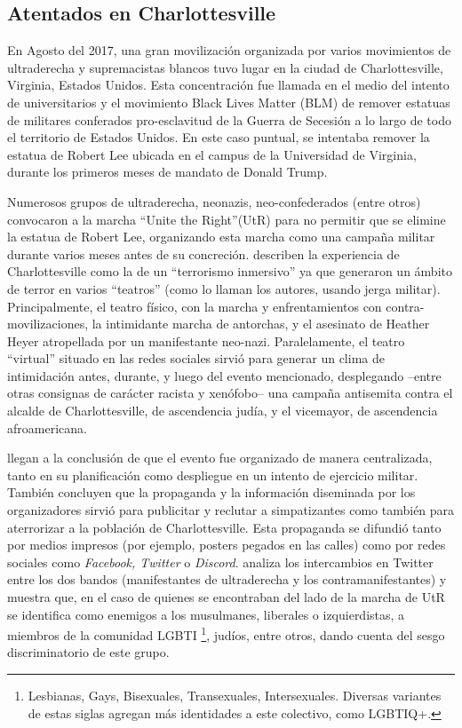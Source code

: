 \subsection{Atentados en Charlottesville}

En Agosto del 2017, una gran movilización organizada por varios movimientos de ultraderecha y supremacistas blancos tuvo lugar en la ciudad de Charlottesville, Virginia, Estados Unidos. Esta concentración fue llamada en el medio del intento de universitarios y el movimiento Black Lives Matter (BLM) de remover estatuas de militares conferados pro-esclavitud de la Guerra de Secesión a lo largo de todo el territorio de Estados Unidos. En este caso puntual, se intentaba remover la estatua de Robert Lee ubicada en el campus de la Universidad de Virginia, durante los primeros meses de mandato de Donald Trump.

Numerosos grupos de ultraderecha, neonazis, neo-confederados (entre otros) convocaron a la marcha ``Unite the Right''(UtR) para no permitir que se elimine la estatua de Robert Lee, organizando esta marcha como una campaña militar durante varios meses antes de su concreción. \citet{blout2020white} describen la experiencia de Charlottesville como la de un ``terrorismo inmersivo'' ya que generaron un ámbito de terror en varios ``teatros'' (como lo llaman los autores, usando jerga militar). Principalmente, el teatro físico, con la marcha y enfrentamientos con contra-movilizaciones, la intimidante marcha de antorchas, y el asesinato de Heather Heyer atropellada por un manifestante neo-nazi. Paralelamente, el teatro ``virtual'' situado en las redes sociales sirvió para generar un clima de intimidación antes, durante, y luego del evento mencionado, desplegando --entre otras consignas de carácter racista y xenófobo-- una campaña antisemita contra el alcalde de Charlottesville, de ascendencia judía, y el vicemayor, de ascendencia afroamericana.

\citet{blout2020white} llegan a la conclusión de que el evento fue organizado de manera centralizada, tanto en su planificación como despliegue en un intento de ejercicio militar. También concluyen que la propaganda y la información diseminada por los organizadores sirvió para publicitar y reclutar a simpatizantes como también para aterrorizar a la población de Charlottesville. Esta propaganda se difundió tanto por medios impresos (por ejemplo, posters pegados en las calles) como por redes sociales como \emph{Facebook, Twitter} o \emph{Discord}. \citet{klein2019twitter} analiza los intercambios en Twitter entre los dos bandos (manifestantes de ultraderecha y los contramanifestantes) y muestra que, en el caso de quienes se encontraban del lado de la marcha de UtR se identifica como enemigos a los musulmanes, liberales o izquierdistas, a miembros de la comunidad LGBTI \footnote{Lesbianas, Gays, Bisexuales, Transexuales, Intersexuales. Diversas variantes de estas siglas agregan más identidades a este colectivo, como LGBTIQ+.}, judíos, entre otros, dando cuenta del sesgo discriminatorio de este grupo.


